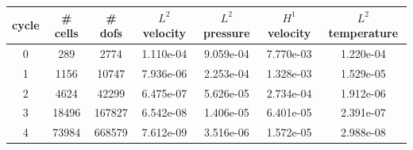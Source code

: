 \documentclass[10pt]{report}
\begin{document}
\begin{table}[H]
\begin{center}
\begin{tabular}{|c|c|c|c|c|c|c|} \hline
cycle & \# cells & \# dofs & $L^2$ velocity & $L^2$ pressure & $H^1$ velocity & $L^2$ temperature\\ \hline
0 & 289 & 2774 & 1.110e-04 & 9.059e-04 & 7.770e-03 & 1.220e-04\\ \hline
1 & 1156 & 10747 & 7.936e-06 & 2.253e-04 & 1.328e-03 & 1.529e-05\\ \hline
2 & 4624 & 42299 & 6.475e-07 & 5.626e-05 & 2.734e-04 & 1.912e-06\\ \hline
3 & 18496 & 167827 & 6.542e-08 & 1.406e-05 & 6.401e-05 & 2.391e-07\\ \hline
4 & 73984 & 668579 & 7.612e-09 & 3.516e-06 & 1.572e-05 & 2.988e-08\\ \hline
\end{tabular}
\end{center}
\end{table}
\end{document}

